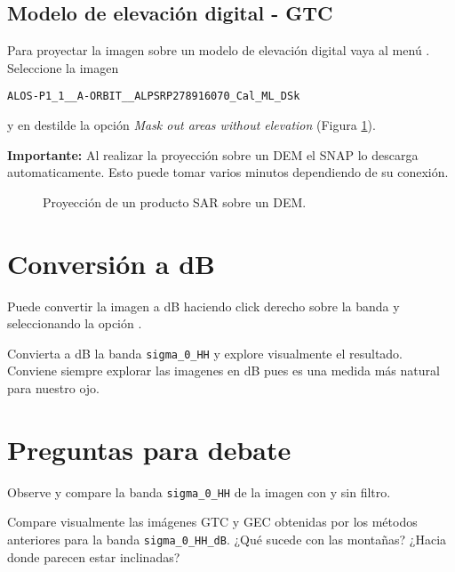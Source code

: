 \subsection{Modelo de elevación digital - GTC}

Para proyectar la imagen sobre un modelo de elevación digital vaya al menú . Seleccione la imagen
\begin{center} \texttt{ALOS-P1\_1\_\_A-ORBIT\_\_ALPSRP278916070\_Cal\_ML\_DSk}
  \end{center}
  y en  destilde la opción \emph{Mask out areas without elevation} (Figura \ref{fig:gtc}).



{\bf Importante:} Al realizar la proyección sobre un DEM el SNAP lo descarga automaticamente. Esto puede tomar varios minutos dependiendo de su conexión.

\begin{figure}[h!]
    \centering
    \hspace{1cm}
    \caption{Proyección de un producto SAR sobre un DEM.}
    \label{fig:gtc}
\end{figure}

\section{Conversión a dB}

Puede convertir la imagen a dB haciendo click derecho sobre la banda y seleccionando la opción .

Convierta a dB la banda \texttt{sigma\_0\_HH} y explore visualmente el resultado. Conviene siempre explorar las imagenes en dB pues es una medida más natural para nuestro ojo.

\section{Preguntas para debate}

\begin{que}
    Observe y compare la banda \texttt{sigma\_0\_HH} de la imagen con y sin filtro.
\end{que}

\begin{que}
    Compare visualmente las imágenes GTC y GEC obtenidas por los métodos anteriores para la banda \texttt{sigma\_0\_HH\_dB}. ¿Qué sucede con las montañas? ¿Hacia donde parecen estar inclinadas?
\end{que}

